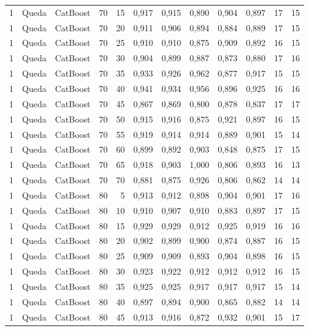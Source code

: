 \begin{longtable}{@{}rllrrrrrrrrr@{}}
1 & Queda & CatBoost & 70 & 15 & 0,917 & 0,915 & 0,890 & 0,904 & 0,897 & 17 & 15 \\
1 & Queda & CatBoost & 70 & 20 & 0,911 & 0,906 & 0,894 & 0,884 & 0,889 & 17 & 15 \\
1 & Queda & CatBoost & 70 & 25 & 0,910 & 0,910 & 0,875 & 0,909 & 0,892 & 16 & 15 \\
1 & Queda & CatBoost & 70 & 30 & 0,904 & 0,899 & 0,887 & 0,873 & 0,880 & 17 & 16 \\
1 & Queda & CatBoost & 70 & 35 & 0,933 & 0,926 & 0,962 & 0,877 & 0,917 & 15 & 15 \\
1 & Queda & CatBoost & 70 & 40 & 0,941 & 0,934 & 0,956 & 0,896 & 0,925 & 16 & 16 \\
1 & Queda & CatBoost & 70 & 45 & 0,867 & 0,869 & 0,800 & 0,878 & 0,837 & 17 & 17 \\
1 & Queda & CatBoost & 70 & 50 & 0,915 & 0,916 & 0,875 & 0,921 & 0,897 & 16 & 15 \\
1 & Queda & CatBoost & 70 & 55 & 0,919 & 0,914 & 0,914 & 0,889 & 0,901 & 15 & 14 \\
1 & Queda & CatBoost & 70 & 60 & 0,899 & 0,892 & 0,903 & 0,848 & 0,875 & 17 & 15 \\
1 & Queda & CatBoost & 70 & 65 & 0,918 & 0,903 & 1,000 & 0,806 & 0,893 & 16 & 13 \\
1 & Queda & CatBoost & 70 & 70 & 0,881 & 0,875 & 0,926 & 0,806 & 0,862 & 14 & 14 \\
1 & Queda & CatBoost & 80 & 5 & 0,913 & 0,912 & 0,898 & 0,904 & 0,901 & 17 & 16 \\
1 & Queda & CatBoost & 80 & 10 & 0,910 & 0,907 & 0,910 & 0,883 & 0,897 & 17 & 15 \\
1 & Queda & CatBoost & 80 & 15 & 0,929 & 0,929 & 0,912 & 0,925 & 0,919 & 16 & 16 \\
1 & Queda & CatBoost & 80 & 20 & 0,902 & 0,899 & 0,900 & 0,874 & 0,887 & 16 & 15 \\
1 & Queda & CatBoost & 80 & 25 & 0,909 & 0,909 & 0,893 & 0,904 & 0,898 & 16 & 15 \\
1 & Queda & CatBoost & 80 & 30 & 0,923 & 0,922 & 0,912 & 0,912 & 0,912 & 16 & 15 \\
1 & Queda & CatBoost & 80 & 35 & 0,925 & 0,925 & 0,917 & 0,917 & 0,917 & 15 & 14 \\
1 & Queda & CatBoost & 80 & 40 & 0,897 & 0,894 & 0,900 & 0,865 & 0,882 & 14 & 14 \\
1 & Queda & CatBoost & 80 & 45 & 0,913 & 0,916 & 0,872 & 0,932 & 0,901 & 15 & 17 \\

\end{longtable}
